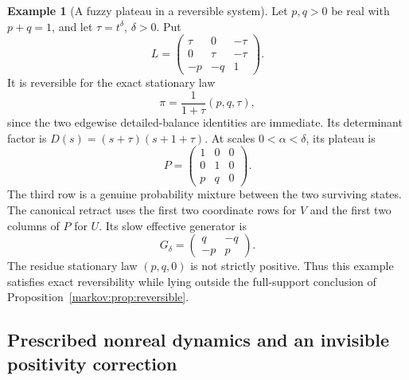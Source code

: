 \documentclass[11pt]{article}
\numberwithin{equation}{section}
\theoremstyle{definition}
\newtheorem{example}[theorem]{Example}
\theoremstyle{remark}
\begin{document}
\begin{example}[A fuzzy plateau in a reversible system]\label{markov:ex:fuzzy}
Let $p,q>0$ be real with $p+q=1$, and let $\tau=t^\delta$, $\delta>0$. Put
\[
 L=\begin{pmatrix}
 \tau&0&-\tau\\
 0&\tau&-\tau\\
 -p&-q&1
 \end{pmatrix}.
\]
It is reversible for the exact stationary law
\[
 \pi=\frac{1}{1+\tau}(p,q,\tau),
\]
since the two edgewise detailed-balance identities are immediate. Its determinant
factor is
$D(s)=(s+\tau)(s+1+\tau)$. At scales $0<\alpha<\delta$, its plateau is
\[
 P=\begin{pmatrix}1&0&0\\0&1&0\\p&q&0\end{pmatrix}.
\]
The third row is a genuine probability mixture between the two surviving states.
The canonical retract uses the first two coordinate rows for $V$ and the first
two columns of $P$ for $U$. Its slow effective generator is
\[
 G_\delta=\begin{pmatrix}q&-q\\-p&p\end{pmatrix}.
\]
The residue stationary law $(p,q,0)$ is not strictly positive. Thus this example
satisfies exact reversibility while lying outside the full-support conclusion
of Proposition~\ref{markov:prop:reversible}.
\end{example}

\subsection{Prescribed nonreal dynamics and an invisible positivity correction}
\end{document}
